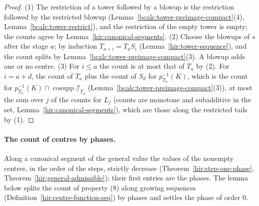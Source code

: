 \begin{proof}
\mixedleanok
(1) The restriction of a tower followed by a blowup is the restriction followed by the restricted blowup (Lemma~\ref{bcalc:tower-preimage-compact}(4),
Lemma~\ref{bcalc:tower-restrict}), and the restriction of the empty tower is empty; the counts agree by Lemma~\ref{hir:canonical-segments}.
(2) Choose the blowups of \(s\) after the stage \(a\); by induction \(T_{a+i}=T_aS_i\) (Lemma~\ref{hir:tower-sequence}), and the count splits by
Lemma~\ref{bcalc:tower-preimage-compact}(3). A blowup adds one or no centre.
(3) For \(i\le a\) the count is at most that of \(T_a\) by (2). For \(i=a+d\), the count of \(T_a\) plus the count of \(S_d\) for \(p_{T_a}^{-1}(K)\), which is the count for
\(p_{T_a}^{-1}(K)\cap\operatorname{cosupp}\underline{\mathcal I}_{T_a}\) (Lemma~\ref{bcalc:tower-preimage-compact}(3)), at most the sum over \(j\) of the counts for \(L_j\)
(counts are monotone and subadditive in the set, Lemma~\ref{hir:canonical-segments}), which are those along the restricted tails by (1).
\end{proof}

\paragraph{The count of centres by phases.} Along a canonical segment of the general value the values of the nonempty centres, in the order of
the steps, strictly decrease (Theorem~\ref{hir:step-one-phase}, Theorem~\ref{hir:general-admissible}); their first entries are the phases. The lemma below splits the count
of property (8) along growing sequences (Definition~\ref{hir:centre-function-seq}) by phases and settles the phase of order \(0\).

